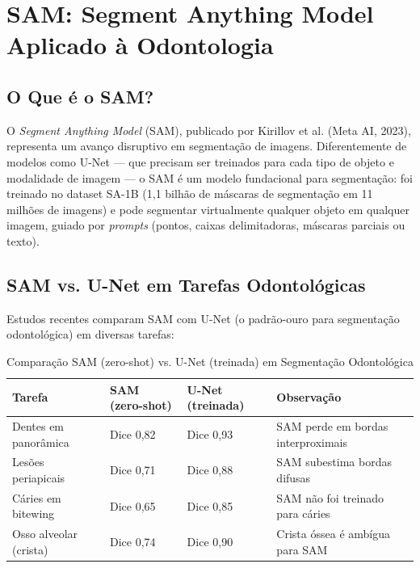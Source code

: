 \section{SAM: Segment Anything Model Aplicado à Odontologia}

\subsection{O Que é o SAM?}

O \textit{Segment Anything Model} (SAM), publicado por Kirillov et al. (Meta AI, 2023), representa um avanço disruptivo em segmentação de imagens. Diferentemente de modelos como U-Net --- que precisam ser treinados para cada tipo de objeto e modalidade de imagem --- o SAM é um modelo fundacional para segmentação: foi treinado no dataset SA-1B (1,1 bilhão de máscaras de segmentação em 11 milhões de imagens) e pode segmentar virtualmente qualquer objeto em qualquer imagem, guiado por \textit{prompts} (pontos, caixas delimitadoras, máscaras parciais ou texto).


\subsection{SAM vs. U-Net em Tarefas Odontológicas}

Estudos recentes comparam SAM com U-Net (o padrão-ouro para segmentação odontológica) em diversas tarefas:

\begin{table}[H]
\centering
\caption{Comparação SAM (zero-shot) vs. U-Net (treinada) em Segmentação Odontológica}
\label{tab:sam-vs-unet}
\begin{tabular}{p{3.5cm}p{2.2cm}p{2.2cm}p{3cm}}
\toprule
\textbf{Tarefa} & \textbf{SAM (zero-shot)} & \textbf{U-Net (treinada)} & \textbf{Observação} \\
\midrule
Dentes em panorâmica & Dice 0,82 & Dice 0,93 & SAM perde em bordas interproximais \\
Lesões periapicais & Dice 0,71 & Dice 0,88 & SAM subestima bordas difusas \\
Cáries em bitewing & Dice 0,65 & Dice 0,85 & SAM não foi treinado para cáries \\
Osso alveolar (crista) & Dice 0,74 & Dice 0,90 & Crista óssea é ambígua para SAM \\
\bottomrule
\end{tabular}
\end{table}

